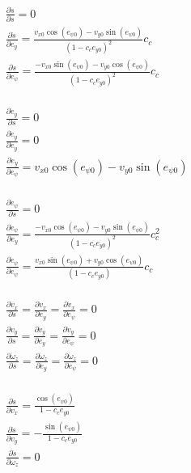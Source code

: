 \documentclass[12pt]{article}
\begin{document}
            
        $\begin{aligned}
            & \frac{\partial \dot{s}}{\partial s} = 0 \\
            & \frac{\partial \dot{s}}{\partial e_y} = \frac{v_{x0} \cos(e_{\psi 0})-v_{y0} \sin(e_{\psi 0})}{(1 - c_c e_{y0})^2} c_c \\
            & \frac{\partial \dot{s}}{\partial e_{\psi}} = \frac{-v_{x0} \sin(e_{\psi 0})-v_{y0} \cos(e_{\psi 0})}{(1 - c_c e_{y0})^2} c_c \\
        \end{aligned}$

        $\begin{aligned}
            & \frac{\partial \dot{e}_y}{\partial s} = 0 \\
            & \frac{\partial \dot{e}_y}{\partial e_y} = 0 \\
            & \frac{\partial \dot{e}_y}{\partial e_{\psi}} = v_{x0} \cos(e_{\psi 0}) - v_{y0} \sin(e_{\psi 0}) \\
        \end{aligned}$

        $\begin{aligned}
            & \frac{\partial \dot{e}_{\psi}}{\partial s} = 0 \\
            & \frac{\partial \dot{e}_{\psi}}{\partial e_y} = \frac{- v_{x0} \cos(e_{\psi 0}) - v_{y0} \sin(e_{\psi 0})}{(1 - c_c e_{y0})^2} c_c^2 \\
            & \frac{\partial \dot{e}_{\psi}}{\partial e_{\psi}} = \frac{v_{x0} \sin(e_{\psi 0}) + v_{y0} \cos(e_{\psi 0})}{(1 - c_c e_{y0})} c_c \\
        \end{aligned}$


        $\begin{aligned}
            & \frac{\partial \dot{v}_x}{\partial s} = \frac{\partial \dot{v}_x}{\partial e_y} = \frac{\partial \dot{v}_x}{\partial e_{\psi}} = 0 \\
            & \frac{\partial \dot{v}_y}{\partial s} = \frac{\partial \dot{v}_y}{\partial e_y} = \frac{\partial \dot{v}_y}{\partial e_{\psi}} = 0 \\
            & \frac{\partial \dot{\omega}_z}{\partial s} = \frac{\partial \dot{\omega}_z}{\partial e_y} = \frac{\partial \dot{\omega}_z}{\partial e_{\psi}} = 0 \\
        \end{aligned}$


        $\begin{aligned}
            & \frac{\partial \dot{s}}{\partial v_x} = \frac{\cos(e_{\psi 0})}{1 - c_c e_{y0}} \\ 
            & \frac{\partial \dot{s}}{\partial v_y} = - \frac{\sin(e_{\psi 0})}{1 - c_c e_{y0}} \\ 
            & \frac{\partial \dot{s}}{\partial \omega_z} = 0 \\
        \end{aligned}$
\end{document}
